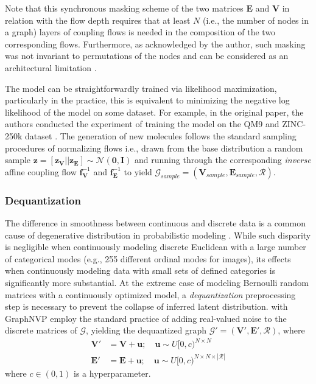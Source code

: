 Note that this synchronous masking scheme of the two matrices $\mathbf{E}$ and
$\mathbf{V}$ in relation with the flow depth requires that at least $N$ (i.e.,
the number of nodes in a graph) layers of coupling flows is needed in the
composition of the two corresponding flows. Furthermore, as acknowledged by the
author, such masking was not invariant to permutations of the nodes and can be
considered as an architectural limitation
\citep{madhawaGraphNVPInvertibleFlow2019}.

The model can be straightforwardly trained via likelihood maximization,
particularly in the practice, this is equivalent to minimizing the negative log
likelihood of the model on some dataset. For example, in the original paper, the
authors conducted the experiment of training the model on the QM9
\citep{ramakrishnanQuantumChemistryStructures2014} and ZINC-250k dataset
\citep{irwinZINCFreeTool2012}. The generation of new molecules follows the
standard sampling procedures of normalizing flows i.e., drawn from the base
distribution a random sample $ \mathbf{z} = [\mathbf{z}_{\mathbf{V}} ||
\mathbf{z}_{\mathbf{E}}] \sim \mathcal{N}(\mathbf{0}, \mathbf{I})$ and running
through the corresponding \textit{inverse} affine coupling flow
$\mathbf{f}^{-1}_{\mathbf{V}}$ and $\mathbf{f}^{-1}_{\mathbf{E}}$ to yield
$\mathcal{G}_{sample} = (\mathbf{V}_{sample}, \mathbf{E}_{sample},
\mathcal{R})$.

\subsubsection{Dequantization}
The difference in smoothness between continuous and discrete data is a common
cause of degenerative distribution in probabilistic modeling
\citep{uriaRNADERealvaluedNeural2013}. While such
disparity is negligible when continuously modeling discrete Euclidean with a large number of categorical
modes (e.g., 255 different ordinal modes for images), its effects when
continuously modeling data with small sets of defined categories is
significantly more substantial. At the extreme case of modeling
Bernoulli random matrices with a continuously optimized model, a \textit{dequantization} preprocessing
step is necessary to prevent the collapse of inferred latent distribution.
\citep{madhawaGraphNVPInvertibleFlow2019} with GraphNVP employ the standard
practice of adding real-valued noise to the discrete matrices of $\mathcal{G}$, yielding the
dequantized graph $\mathcal{G}' = (\mathbf{V}', \mathbf{E}', \mathcal{R})$,
where
\begin{align*}
  \mathbf{V}' &= \mathbf{V} + \mathbf{u}; \quad \mathbf{u} \sim U[0,c)^{N \times N}\\
  \mathbf{E}' &= \mathbf{E} + \mathbf{u}; \quad \mathbf{u} \sim U[0,c)^{N \times N \times |\mathcal{R}|}
\end{align*}
where $c \in (0,1)$ is a hyperparameter.

